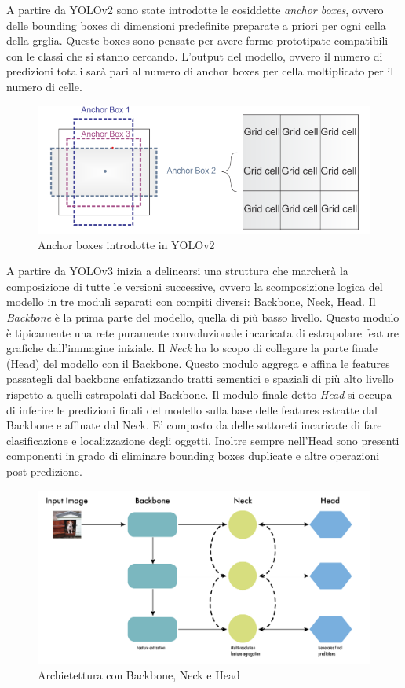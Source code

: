 \documentclass[12pt,a4paper,openright,twoside]{report}
\begin{document}
A partire da YOLOv2 sono state introdotte le cosiddette \emph{anchor boxes}, ovvero delle bounding boxes di dimensioni predefinite preparate a priori per ogni cella della grglia. Queste boxes sono pensate per avere forme prototipate compatibili con le classi che si stanno cercando. L'output del modello, ovvero il numero di predizioni totali sarà pari al numero di anchor boxes per cella moltiplicato per il numero di celle.
\begin{figure}[h]
\centering
\includegraphics[width=\linewidth]{anchor.png}
\caption{Anchor boxes introdotte in YOLOv2}
\end{figure}
A partire da YOLOv3 inizia a delinearsi una struttura che marcherà la composizione di tutte le versioni successive, ovvero la scomposizione logica del modello in tre moduli separati con compiti diversi: Backbone, Neck, Head.
Il \emph{Backbone} è la prima parte del modello, quella di più basso livello. Questo modulo è tipicamente una rete puramente convoluzionale incaricata di estrapolare feature grafiche dall'immagine iniziale.
Il \emph{Neck} ha lo scopo di collegare la parte finale (Head) del modello con il Backbone. Questo modulo aggrega e affina le features passategli dal backbone enfatizzando tratti sementici e spaziali di più alto livello rispetto a quelli estrapolati dal Backbone. 
Il modulo finale detto \emph{Head} si occupa di inferire le predizioni finali del modello sulla base delle features estratte dal Backbone e affinate dal Neck. E' composto da delle sottoreti incaricate di fare clasificazione e localizzazione degli oggetti. Inoltre sempre nell'Head sono presenti componenti in grado di eliminare bounding boxes duplicate e altre operazioni post predizione.
\begin{figure}[h]
\centering
\includegraphics[width=\linewidth]{backbone_neck_head.png}
\caption{Archietettura con Backbone, Neck e Head}
\end{figure}
\end{document}
